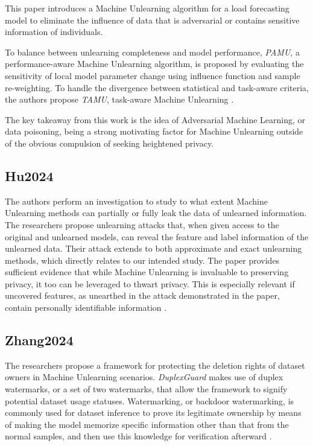         This paper introduces a Machine Unlearning algorithm for a load forecasting model to eliminate the influence of data that is adversarial or contains sensitive information of individuals. 
        
        To balance between unlearning completeness and model performance, \textit{PAMU}, a performance-aware Machine Unlearning algorithm, is proposed by evaluating the sensitivity of local model parameter change using influence function and sample re-weighting. To handle the divergence between statistical and task-aware criteria, the authors propose \textit{TAMU}, task-aware Machine Unlearning \cite{WangkunXu2024}.
        
        The key takeaway from this work is the idea of Adversarial Machine Learning, or data poisoning, being a strong motivating factor for Machine Unlearning outside of the obvious compulsion of seeking heightened privacy.
    
    \subsection{Hu2024}
    \label{subsec:Hu2024}
    
        The authors perform an investigation to study to what extent Machine Unlearning methods can partially or fully leak the data of unlearned information. The researchers propose unlearning attacks that, when given access to the original and unlearned models, can reveal the feature and label information of the unlearned data. Their attack extends to both approximate and exact unlearning methods, which directly relates to our intended study. The paper provides sufficient evidence that while Machine Unlearning is invaluable to preserving privacy, it too can be leveraged to thwart privacy. This is especially relevant if uncovered features, as unearthed in the attack demonstrated in the paper, contain personally identifiable information \cite{Hu2024}.
    
    \subsection{Zhang2024}
    \label{subsec:Zhang2024}
    
        The researchers propose a framework for protecting the deletion rights of dataset owners in Machine Unlearning scenarios. \textit{DuplexGuard} makes use of duplex watermarks, or a set of two watermarks, that allow the framework to signify potential dataset usage statuses. Watermarking, or backdoor watermarking, is commonly used for dataset inference to prove its legitimate ownership by means of making the model memorize specific information other than that from the normal samples, and then use this knowledge for verification afterward \cite{Zhang2024}.
        
